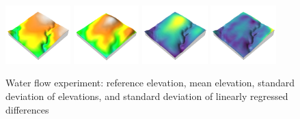 \documentclass[prodmode,acmtochi]{acmsmall} %
\begin{document}
\begin{figure}[h!]
\begin{center}
		\includegraphics[width=0.225\textwidth]{images/render_3d/dem_5.png}
		\includegraphics[width=0.225\textwidth]{images/render_3d/mean_dem_5.png}
		\includegraphics[width=0.225\textwidth]{images/render_3d/stdev_dem_5.png}
		\includegraphics[width=0.225\textwidth]{images/render_3d/stdev_regression_difference_series_5.png}
	\caption{Water flow experiment: reference elevation, mean elevation, standard deviation of elevations, and standard deviation of linearly regressed differences}
	\label{fig:}
\end{center}
\end{figure}
\end{document}

